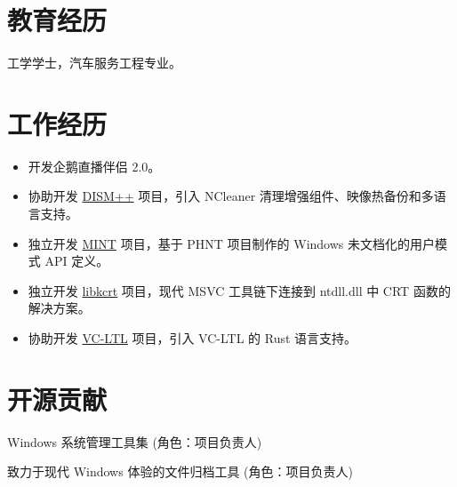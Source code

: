 \documentclass{resume}
\begin{document}
\renewcommand\headrulewidth{0pt}



\section{教育经历}

  工学学士，汽车服务工程专业。

\section{工作经历}

\begin{itemize}
  \item 开发企鹅直播伴侣 2.0。
\end{itemize}

\begin{itemize}
  \item 协助开发 \href{https://github.com/Chuyu-Team/Dism-Multi-language/releases/latest}{DISM++} 项目，引入 NCleaner 清理增强组件、映像热备份和多语言支持。
  \item 独立开发 \href{https://github.com/Chuyu-Team/MINT}{MINT} 项目，基于 PHNT 项目制作的 Windows 未文档化的用户模式 API 定义。
  \item 独立开发 \href{https://github.com/Chuyu-Team/libkcrt}{libkcrt} 项目，现代 MSVC 工具链下连接到 ntdll.dll 中 CRT 函数的解决方案。
  \item 协助开发 \href{https://github.com/Chuyu-Team/VC-LTL5}{VC-LTL} 项目，引入 VC-LTL 的 Rust 语言支持。
\end{itemize}

\section{开源贡献}

Windows 系统管理工具集 (角色：项目负责人)

致力于现代 Windows 体验的文件归档工具 (角色：项目负责人)
\end{document}

